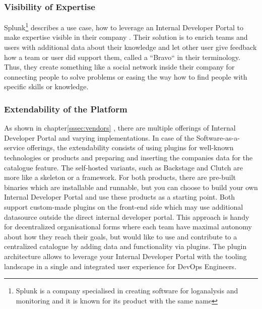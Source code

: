 \documentclass[a4paper,12pt]{article}
\begin{document}
    \subsubsection{Visibility of Expertise}
    \label{sssec:expertise}
    Splunk\footnote{Splunk is a company specialised in creating software for loganalysis and monitoring and it is known
    for its product with the same name}
    describes a use case, how to leverage an Internal Developer Portal to make expertise visible in their
    company\parencite{splunkidp} .
    Their solution is to enrich teams and users with additional data about their knowledge and let other user give feedback
    how a team or user did support them, called a ``Bravo`` in their terminology.
    Thus, they create something like a social network inside their company for connecting people to solve problems or
    easing the way how to find people with specific skills or knowledge.

    \subsubsection{Extendability of the Platform}
    \label{sssec:extendability}
    As shown in chapter\ref{sssec:vendors} , there are multiple offerings of Internal Developer Portal and varying
    implementations.
    In case of the Software-as-a-service offerings, the extendability consists of using plugins for well-known
    technologies or products and preparing and inserting the companies data for the catalogue feature.
    The self-hosted variants, such as Backstage and Clutch are more like a skeleton or a framework.
    For both products, there are pre-built binaries which are installable and runnable, but you can choose to build your
    own Internal Developer Portal and use these products as a starting point.
    Both support custom-made plugins on the front-end side which may use additional datasource outside the direct
    internal developer portal.
    This approach is handy for decentralized organisational forms where each team have maximal autonomy about how they
    reach their goals, but would like to use and contribute to a centralized catalogue by adding data and functionality
    via plugins.
    The plugin architecture allows to leverage your Internal Developer Portal with the tooling landscape in a
    single and integrated user experience for DevOps Engineers.
\end{document}
